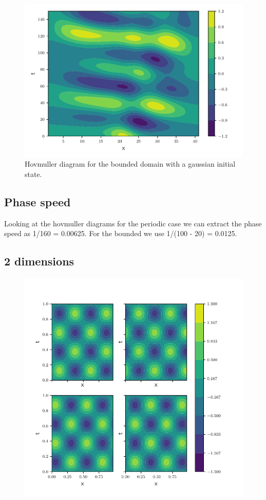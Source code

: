 \begin{figure}[htp]
  \centering
  \includegraphics[width=\textwidth]{../figures/psi_bounded_centered_gauss.pdf}
  \caption{Hovmuller diagram for the bounded domain with a gaussian initial
  state.}
  \label{fig:bounded_gauss}
\end{figure}


\subsection{Phase speed}


Looking at the hovmuller diagrams for the periodic case we
can extract the phase speed as 1/160 = 0.00625.
For the bounded we use 1/(100 - 20) = 0.0125.


\subsection{2 dimensions}


\begin{figure}[htp]
  \centering
  \includegraphics[width=\textwidth]{../figures/periodic_2d.pdf}
  \caption{}
  \label{fig:2d_periodic}
\end{figure}


